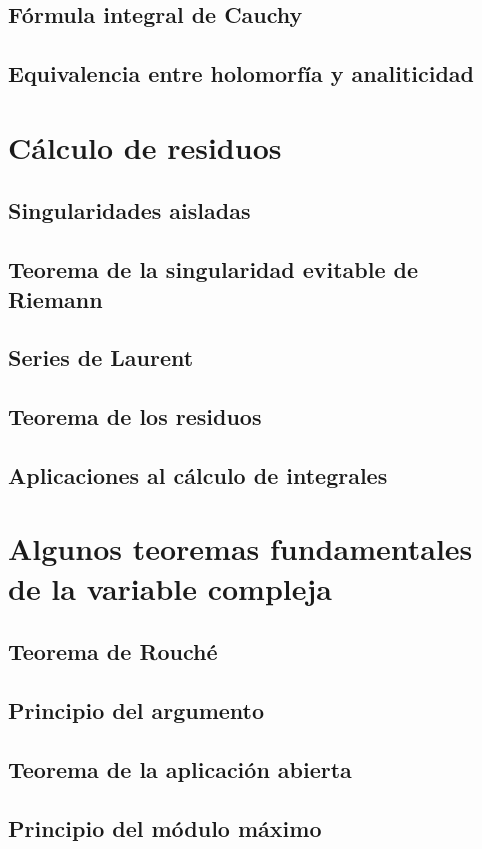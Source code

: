 \documentclass{apuntes}
\begin{document}
\section{Fórmula integral de Cauchy}
\section{Equivalencia entre holomorfía y analiticidad}


\chapter{Cálculo de residuos}
\section{Singularidades aisladas}
\section{Teorema de la singularidad evitable de Riemann}
\section{Series de Laurent}
\section{Teorema de los residuos}
\section{Aplicaciones al cálculo de integrales}


\chapter{Algunos teoremas fundamentales de la variable compleja}
\section{Teorema de Rouché}
\section{Principio del argumento}
\section{Teorema de la aplicación abierta}
\section{Principio del módulo máximo}
\end{document}
